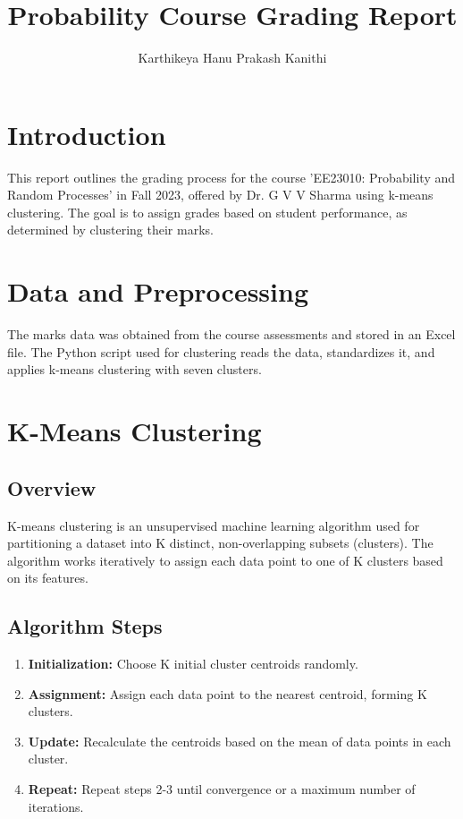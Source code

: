 \documentclass{article}
\title{\textcolor{mygold}{Probability Course Grading Report}}
\author{\textcolor{mygold}{Karthikeya Hanu Prakash Kanithi}}
\begin{document}
\maketitle

\section{\textcolor{mygold}{Introduction}}

This report outlines the grading process for the course 'EE23010: Probability and Random Processes' in Fall 2023, offered by Dr. G V V Sharma using k-means clustering. The goal is to assign grades based on student performance, as determined by clustering their marks.

\section{\textcolor{mygold}{Data and Preprocessing}}

The marks data was obtained from the course assessments and stored in an Excel file. The Python script used for clustering reads the data, standardizes it, and applies k-means clustering with seven clusters.

\section{\textcolor{mygold}{K-Means Clustering}}

\subsection{\textcolor{mygold}{Overview}}

K-means clustering is an unsupervised machine learning algorithm used for partitioning a dataset into K distinct, non-overlapping subsets (clusters). The algorithm works iteratively to assign each data point to one of K clusters based on its features.

\subsection{\textcolor{mygold}{Algorithm Steps}}

\begin{enumerate}
    \item \textbf{Initialization:} Choose K initial cluster centroids randomly.
    \item \textbf{Assignment:} Assign each data point to the nearest centroid, forming K clusters.
    \item \textbf{Update:} Recalculate the centroids based on the mean of data points in each cluster.
    \item \textbf{Repeat:} Repeat steps 2-3 until convergence or a maximum number of iterations.
\end{enumerate}
\end{document}
